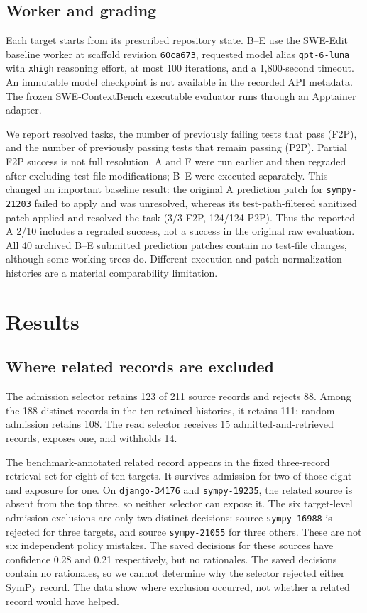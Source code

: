 \documentclass[sigconf,anonymous]{aamas}
\begin{document}
\subsection{Worker and grading}
Each target starts from its prescribed repository state. B--E use the SWE-Edit baseline worker at scaffold revision \texttt{60ca673}, requested model alias \texttt{gpt-6-luna} with \texttt{xhigh} reasoning effort, at most 100 iterations, and a 1,800-second timeout. An immutable model checkpoint is not available in the recorded API metadata. The frozen SWE-ContextBench executable evaluator runs through an Apptainer adapter.

We report resolved tasks, the number of previously failing tests that pass (F2P), and the number of previously passing tests that remain passing (P2P). Partial F2P success is not full resolution. A and F were run earlier and then regraded after excluding test-file modifications; B--E were executed separately. This changed an important baseline result: the original A prediction patch for \texttt{sympy-21203} failed to apply and was unresolved, whereas its test-path-filtered sanitized patch applied and resolved the task (3/3 F2P, 124/124 P2P). Thus the reported A 2/10 includes a regraded success, not a success in the original raw evaluation. All 40 archived B--E submitted prediction patches contain no test-file changes, although some working trees do. Different execution and patch-normalization histories are a material comparability limitation.

\section{Results}
\subsection{Where related records are excluded}
The admission selector retains 123 of 211 source records and rejects 88. Among the 188 distinct records in the ten retained histories, it retains 111; random admission retains 108. The read selector receives 15 admitted-and-retrieved records, exposes one, and withholds 14.

The benchmark-annotated related record appears in the fixed three-record retrieval set for eight of ten targets. It survives admission for two of those eight and exposure for one. On \texttt{django-34176} and \texttt{sympy-19235}, the related source is absent from the top three, so neither selector can expose it. The six target-level admission exclusions are only two distinct decisions: source \texttt{sympy-16988} is rejected for three targets, and source \texttt{sympy-21055} for three others. These are not six independent policy mistakes. The saved decisions for these sources have confidence 0.28 and 0.21 respectively, but no rationales. The saved decisions contain no rationales, so we cannot determine why the selector rejected either SymPy record. The data show where exclusion occurred, not whether a related record would have helped.
\end{document}
